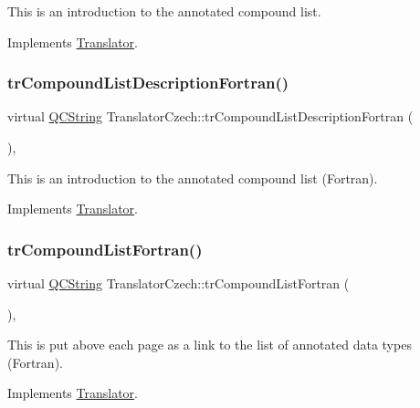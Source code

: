 This is an introduction to the annotated compound list. 

Implements \mbox{\hyperlink{class_translator}{Translator}}.

\mbox{\label{class_translator_czech_ace1c18e4f6116a301f6a4ca57e06ac4a}} 
\subsubsection{\texorpdfstring{trCompoundListDescriptionFortran()}{trCompoundListDescriptionFortran()}}
{\footnotesize\ttfamily virtual \mbox{\hyperlink{class_q_c_string}{Q\+C\+String}} Translator\+Czech\+::tr\+Compound\+List\+Description\+Fortran (\begin{DoxyParamCaption}{ }\end{DoxyParamCaption})\hspace{0.3cm}{\ttfamily [inline]}, {\ttfamily [virtual]}}

This is an introduction to the annotated compound list (Fortran). 

Implements \mbox{\hyperlink{class_translator}{Translator}}.

\mbox{\label{class_translator_czech_aed6713142c9249fc0566224917208360}} 
\subsubsection{\texorpdfstring{trCompoundListFortran()}{trCompoundListFortran()}}
{\footnotesize\ttfamily virtual \mbox{\hyperlink{class_q_c_string}{Q\+C\+String}} Translator\+Czech\+::tr\+Compound\+List\+Fortran (\begin{DoxyParamCaption}{ }\end{DoxyParamCaption})\hspace{0.3cm}{\ttfamily [inline]}, {\ttfamily [virtual]}}

This is put above each page as a link to the list of annotated data types (Fortran). 

Implements \mbox{\hyperlink{class_translator}{Translator}}.

